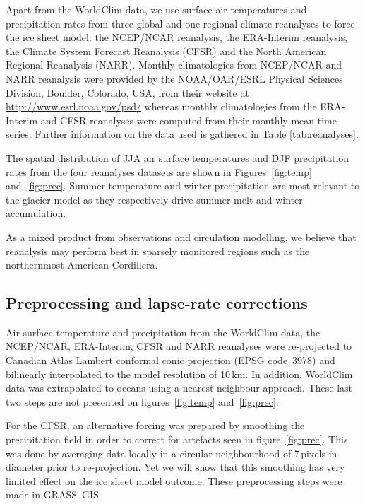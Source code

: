 Apart from the WorldClim data, we use surface air temperatures and precipitation rates from three global and one regional climate reanalyses to force the ice sheet model: the NCEP/NCAR reanalysis, the ERA-Interim reanalysis, the Climate System Forecast Reanalysis (CFSR) and the North American Regional Reanalysis (NARR). Monthly climatologies from NCEP/NCAR and NARR reanalysis were provided by the NOAA/OAR/ESRL Physical Sciences Division, Boulder, Colorado, USA, from their website at \url{http://www.esrl.noaa.gov/psd/} whereas monthly climatologies from the ERA-Interim and CFSR reanalyses were computed from their monthly mean time series. Further information on the data used is gathered in Table \ref{tab:reanalyses}.

The spatial distribution of JJA air surface temperatures and DJF precipitation rates from the four reanalyses datasets are shown in Figures~\ref{fig:temp} and~\ref{fig:prec}. Summer temperature and winter precipitation are most relevant to the glacier model as they respectively drive summer melt and winter accumulation.

As a mixed product from observations and circulation modelling, we believe that reanalysis may perform best in sparsely monitored regions such as the northernmost American Cordillera.


\subsection{Preprocessing and lapse-rate corrections}

Air surface temperature and precipitation from the WorldClim data, the NCEP/NCAR, ERA-Interim, CFSR and NARR reanalyses were re-projected to Canadian Atlas Lambert conformal conic projection (EPSG code~3978) and bilinearly interpolated to the model resolution of 10\,km. In addition, WorldClim data was extrapolated to oceans using a nearest-neighbour approach. These last two steps are not presented on figures~\ref{fig:temp} and~\ref{fig:prec}.

For the CFSR, an alternative forcing was prepared by smoothing the precipitation field in order to correct for artefacts seen in figure~\ref{fig:prec}. This was done by averaging data locally in a circular neighbourhood of 7\,pixels in diameter prior to re-projection. Yet we will show that this smoothing has very limited effect on the ice sheet model outcome. These preprocessing steps were made in GRASS~GIS.

